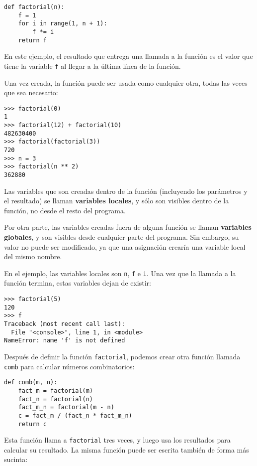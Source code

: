 \begin{lstlisting}
def factorial(n):
    f = 1
    for i in range(1, n + 1):
        f *= i
    return f
\end{lstlisting}

En este ejemplo, el resultado que entrega una llamada a la función es el
valor que tiene la variable \lstinline!f! al llegar a la última línea de
la función.

Una vez creada, la función puede ser usada como cualquier otra, todas
las veces que sea necesario:

\begin{lstlisting}
>>> factorial(0)
1
>>> factorial(12) + factorial(10)
482630400
>>> factorial(factorial(3))
720
>>> n = 3
>>> factorial(n ** 2)
362880
\end{lstlisting}

Las variables que son creadas dentro de la función (incluyendo los
parámetros y el resultado) se llaman \textbf{variables locales}, y sólo
son visibles dentro de la función, no desde el resto del programa.

Por otra parte, las variables creadas fuera de alguna función se llaman
\textbf{variables globales}, y son visibles desde cualquier parte del
programa. Sin embargo, su valor no puede ser modificado, ya que una
asignación crearía una variable local del mismo nombre.

En el ejemplo, las variables locales son \lstinline!n!, \lstinline!f! e
\lstinline!i!. Una vez que la llamada a la función termina, estas
variables dejan de existir:

\begin{lstlisting}
>>> factorial(5)
120
>>> f
Traceback (most recent call last):
  File "<console>", line 1, in <module>
NameError: name 'f' is not defined
\end{lstlisting}

Después de definir la función \lstinline!factorial!, podemos crear otra
función llamada \lstinline!comb! para calcular números combinatorios:

\begin{lstlisting}
def comb(m, n):
    fact_m = factorial(m)
    fact_n = factorial(n)
    fact_m_n = factorial(m - n)
    c = fact_m / (fact_n * fact_m_n)
    return c
\end{lstlisting}

Esta función llama a \lstinline!factorial! tres veces, y luego usa los
resultados para calcular su resultado. La misma función puede ser
escrita también de forma más sucinta:

